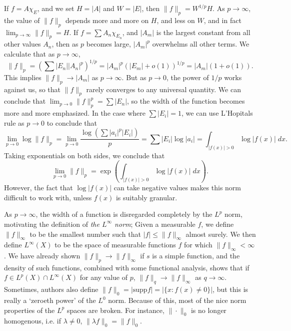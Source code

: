 \begin{example}
  If $f = A \chi_E$, and we set $H = |A|$ and $W = |E|$, then $\| f \|_p = W^{1/p} H$. As $p \to \infty$, the value of $\| f \|_p$ depends more and more on $H$, and less on $W$, and in fact $\lim_{p \to \infty} \| f \|_p = H$. If $f = \sum A_n \chi_{E_n}$, and $|A_m|$ is the largest constant from all other values $A_n$, then as $p$ becomes large, $|A_m|^p$ overwhelms all other terms. We calculate that as $p \to \infty$,
  \[ \| f \|_p = \left( \sum |E_n| |A_n|^p \right)^{1/p} = |A_m|^p (|E_m| + o(1))^{1/p} = |A_m| (1 + o(1)). \]
  This implies $\| f \|_p \to |A_m|$ as $p \to \infty$. But as $p \to 0$, the power of $1/p$ works against us, so that $\| f \|_p$ rarely converges to any universal quantity. We can conclude that $\lim_{p \to 0} \| f \|_p^p = \sum |E_n|$, so the width of the function becomes more and more emphasized. In the case where $\sum |E_i| = 1$, we can use L'Hopitals rule as $p \to 0$ to conclude that
  \[ \lim_{p \to 0} \log \| f \|_p = \lim_{p \to 0} \frac{\log(\sum |a_i|^p |E_i|)}{p} = \sum |E_i| \log |a_i| = \int_{|f(x)| > 0} \log |f(x)|\; dx. \]
  Taking exponentials on both sides, we conclude that
  \[ \lim_{p \to 0} \| f \|_p = \exp \left( \int_{|f(x)| > 0} \log |f(x)|\; dx \right). \]
  However, the fact that $\log |f(x)|$ can take negative values makes this norm difficult to work with, unless $f(x)$ is suitably granular.
\end{example}

As $p \to \infty$, the width of a function is disregarded completely by the $L^p$ norm, motivating the definition of \emph{the $L^\infty$ norm}; Given a measurable $f$, we define $\| f \|_\infty$ to be the smallest number such that $|f| \leq \| f \|_\infty$ almost surely. We then define $L^\infty(X)$ to be the space of measurable functions $f$ for which $\| f \|_\infty < \infty$. We have already shown $\| f \|_p \to \| f \|_\infty$ if $s$ is a simple function, and the density of such functions, combined with some functional analysis, shows that if $f \in L^p(X) \cap L^\infty(X)$ for any value of $p$, $\| f \|_q \to \| f \|_\infty$ as $q \to \infty$. Sometimes, authors also define $\| f \|_0 = | \text{supp} f | = | \{ x: f(x) \neq 0 \} |$, but this is really a `zeroeth power' of the $L^0$ norm. Because of this, most of the nice norm properties of the $L^p$ spaces are broken. For instance, $\| \cdot \|_0$ is no longer homogenous, i.e. if $\lambda \neq 0$, $\| \lambda f \|_0 = \| f \|_0$.

